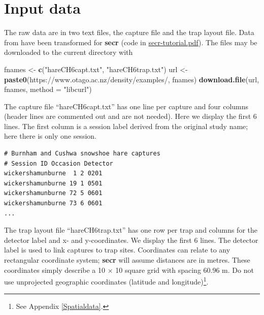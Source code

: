 \documentclass[
]{book}
\newenvironment{Shaded}{\begin{snugshade}}{\end{snugshade}}
\newcommand{\AttributeTok}[1]{\textcolor[rgb]{0.13,0.29,0.53}{#1}}
\newcommand{\FunctionTok}[1]{\textcolor[rgb]{0.13,0.29,0.53}{\textbf{#1}}}
\newcommand{\NormalTok}[1]{#1}
\newcommand{\OtherTok}[1]{\textcolor[rgb]{0.56,0.35,0.01}{#1}}
\newcommand{\StringTok}[1]{\textcolor[rgb]{0.31,0.60,0.02}{#1}}
\begin{document}
\section{Input data}\label{input-data}

The raw data are in two text files, the capture file and the trap layout file. Data from \citet{obwa78} have been transformed for \textbf{secr} (code in \href{https://www.otago.ac.nz/density/pdfs/secr-tutorial.pdf}{secr-tutorial.pdf}). The files may be downloaded to the current directory with

\begin{Shaded}
\begin{Highlighting}[]
\NormalTok{fnames }\OtherTok{\textless{}{-}} \FunctionTok{c}\NormalTok{(}\StringTok{"hareCH6capt.txt"}\NormalTok{, }\StringTok{"hareCH6trap.txt"}\NormalTok{)}
\NormalTok{url }\OtherTok{\textless{}{-}} \FunctionTok{paste0}\NormalTok{(}\StringTok{\textquotesingle{}https://www.otago.ac.nz/density/examples/\textquotesingle{}}\NormalTok{, fnames)}
\FunctionTok{download.file}\NormalTok{(url, fnames, }\AttributeTok{method =} \StringTok{"libcurl"}\NormalTok{)}
\end{Highlighting}
\end{Shaded}

The capture file ``hareCH6capt.txt'' has one line per capture and four columns (header lines are commented out and are not needed). Here we display the first 6 lines. The first column is a session label derived from the original study name; here there is only one session.

\begin{verbatim}
# Burnham and Cushwa snowshoe hare captures
# Session ID Occasion Detector 
wickershamunburne  1 2 0201
wickershamunburne 19 1 0501
wickershamunburne 72 5 0601
wickershamunburne 73 6 0601
... 
\end{verbatim}

\vspace{12pt}

The trap layout file ``hareCH6trap.txt'' has one row per trap and columns for the detector label and x- and y-coordinates. We display the first 6 lines. The detector label is used to link captures to trap sites. Coordinates can relate to any rectangular coordinate system; \textbf{secr} will assume distances are in metres. These coordinates simply describe a 10 \(\times\) 10 square grid with spacing 60.96 m. Do not use unprojected geographic coordinates (latitude and longitude)\footnote{See Appendix \ref{Spatialdata}.}.
\end{document}

